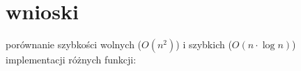 \documentclass[12pt]{article}
\begin{document}
\section{wnioski}
porównanie szybkości wolnych ($O(n^{2})$) i szybkich ($O(n\cdot\log{n})$) implementacji różnych funkcji:





\newpage
\cite{instrukcja}
\renewcommand\refname{Bibliografia}


\end{document}
